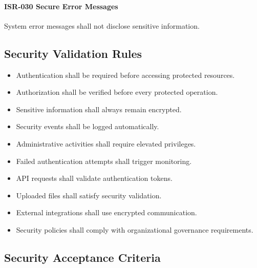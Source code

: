 \paragraph{ISR-030 Secure Error Messages}

System error messages shall not disclose sensitive information.


\subsection*{Security Validation Rules}

\begin{itemize}

\item Authentication shall be required before accessing protected
resources.

\item Authorization shall be verified before every protected operation.

\item Sensitive information shall always remain encrypted.

\item Security events shall be logged automatically.

\item Administrative activities shall require elevated privileges.

\item Failed authentication attempts shall trigger monitoring.

\item API requests shall validate authentication tokens.

\item Uploaded files shall satisfy security validation.

\item External integrations shall use encrypted communication.

\item Security policies shall comply with organizational governance
requirements.

\end{itemize}


\subsection*{Security Acceptance Criteria}

